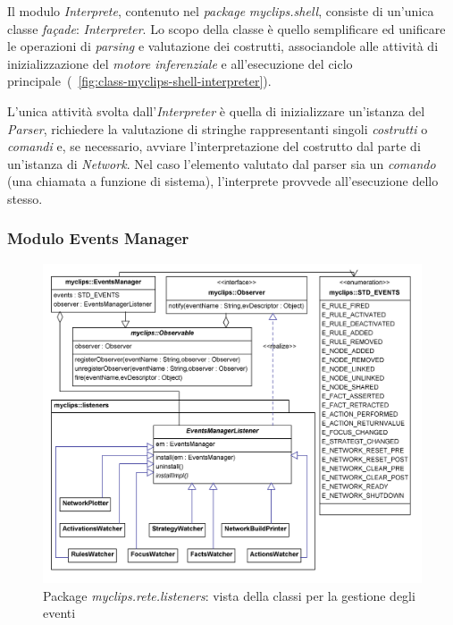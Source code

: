 Il modulo \emph{Interprete}, contenuto nel \emph{package} \emph{myclips.shell}, consiste di un'unica classe \emph{fa\c{c}ade}: \emph{Interpreter}. Lo scopo della classe è quello semplificare ed unificare le operazioni di \emph{parsing} e valutazione dei costrutti, associandole alle attività di inizializzazione del \emph{motore inferenziale} e all'esecuzione del ciclo principale~(\figurename~\ref{fig:class-myclips-shell-interpreter}).

L'unica attività svolta dall'\emph{Interpreter} è quella di inizializzare un'istanza del \emph{Parser}, richiedere la valutazione di stringhe rappresentanti singoli \emph{costrutti} o \emph{comandi} e, se necessario, avviare l'interpretazione del costrutto dal parte di un'istanza di \emph{Network}. Nel caso l'elemento valutato dal parser sia un \emph{comando} (una chiamata a funzione di sistema), l'interprete provvede all'esecuzione dello stesso.

\subsubsection{Modulo Events Manager}

\begin{figure}[h]
\centering
\includegraphics[width=1\textwidth]{Immagini/Capitolo3/Classi/myclips_EventsManager-Listeners.png}
\caption{Package \emph{myclips.rete.listeners}: vista della classi per la gestione degli eventi}\label{fig:class-myclips-eventsmanager}
\end{figure}

